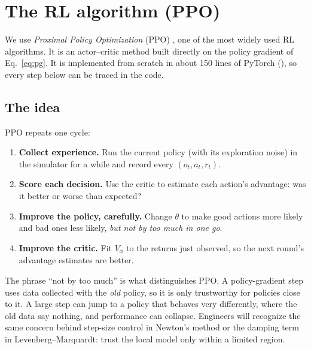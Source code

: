 \section{The RL algorithm (PPO)}\label{sec:ppo}

We use \emph{Proximal Policy Optimization} (PPO) \cite{schulman2017ppo},
one of the most widely used RL algorithms. It is an actor--critic method
built directly on the policy gradient of Eq.~\eqref{eq:pg}. It is
implemented from scratch in about 150 lines of PyTorch
(), so every step below can be traced in the code.

\subsection{The idea}
PPO repeats one cycle:
\begin{enumerate}\itemsep1pt
\item \textbf{Collect experience.} Run the current policy (with its
exploration noise) in the simulator for a while and record every
$(o_t,a_t,r_t)$.
\item \textbf{Score each decision.} Use the critic to estimate each
action's advantage: was it better or worse than expected?
\item \textbf{Improve the policy, carefully.} Change $\theta$ to make
good actions more likely and bad ones less likely, \emph{but not by too
much in one go}.
\item \textbf{Improve the critic.} Fit $V_\phi$ to the returns just
observed, so the next round's advantage estimates are better.
\end{enumerate}
The phrase ``not by too much'' is what distinguishes PPO. A policy-gradient
step uses data collected with the \emph{old} policy, so it is only
trustworthy for policies close to it. A large step can jump to a policy
that behaves very differently, where the old data say nothing, and
performance can collapse. Engineers will recognize the same concern behind
step-size control in Newton's method or the damping term in
Levenberg--Marquardt: trust the local model only within a limited region.

